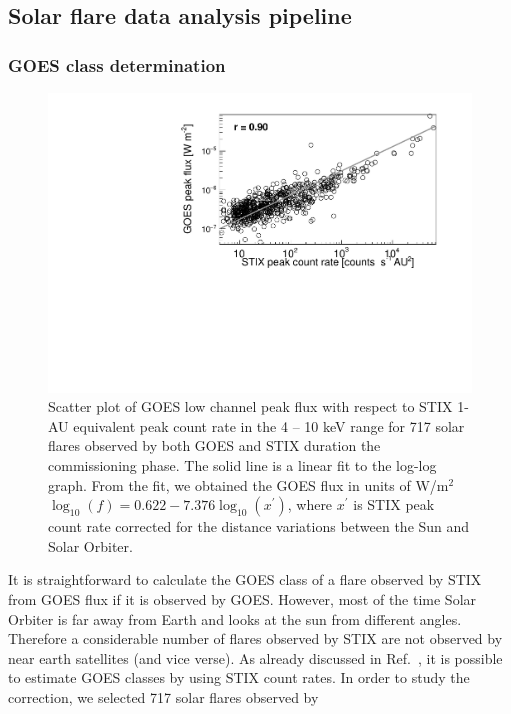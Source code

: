 \documentclass{aa}
\begin{document}
\subsection{Solar flare data analysis pipeline}
\subsubsection{GOES class determination}
\begin{figure}
  \centering
  \includegraphics[width=0.8\linewidth]{figures/goes_stix_flux_paper.pdf}
  \caption{Scatter plot of GOES low channel peak flux with respect to STIX 1-AU equivalent  peak count rate in the 4 -- 10 keV range
  for 717 solar flares observed by both GOES and STIX duration the commissioning phase. 
  The solid line is a linear fit to the log-log graph. 
From the fit, we obtained 
the GOES flux in units of W/m$^2$ $\log_{10}(f) = 0.622 -7.376 \log_{10} (x^{'})$,
where $x^{'}$ is STIX
peak count rate corrected for the distance variations between the Sun and Solar Orbiter. 
}
\label{fig:goes-stix}
\end{figure}
It is straightforward to calculate the GOES
class of a flare observed by STIX from GOES flux if it is observed by GOES. 
However,  most of the time Solar Orbiter is far away from Earth and looks at 
the sun from different angles. Therefore a considerable number of flares observed by STIX
 are not observed by near earth satellites (and vice verse). 
As already discussed in Ref.~\cite{andrea2021}, 
it is possible to estimate GOES classes by using STIX count rates.
In order to study the correction, we selected 717 solar flares observed by 
\end{document}
